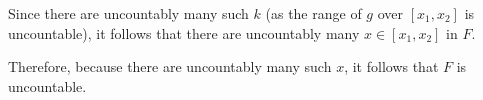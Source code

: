 {    Since there are uncountably many such \(k\) (as the range of \(g\) over \([x_{1}, x_{2}]\) is uncountable), it follows that there are uncountably many \(x \in [x_{1}, x_{2}]\) in \(F\).


    Therefore, because there are uncountably many such \(x\), it follows that \(F\) is uncountable.\qedhere














}
